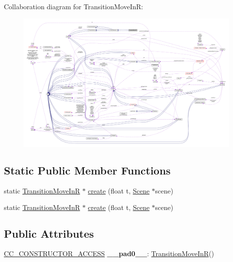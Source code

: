 Collaboration diagram for Transition\+Move\+InR\+:
\nopagebreak
\begin{figure}[H]
\begin{center}
\leavevmode
\includegraphics[width=350pt]{classTransitionMoveInR__coll__graph}
\end{center}
\end{figure}
\subsection*{Static Public Member Functions}
\begin{DoxyCompactItemize}
\item 
static \hyperlink{classTransitionMoveInR}{Transition\+Move\+InR} $\ast$ \hyperlink{classTransitionMoveInR_a37e498709830d50089d710dd6f182a30}{create} (float t, \hyperlink{classScene}{Scene} $\ast$scene)
\item 
static \hyperlink{classTransitionMoveInR}{Transition\+Move\+InR} $\ast$ \hyperlink{classTransitionMoveInR_af8cc045bd473dde2f0d0af7193c61b3d}{create} (float t, \hyperlink{classScene}{Scene} $\ast$scene)
\end{DoxyCompactItemize}
\subsection*{Public Attributes}
\begin{DoxyCompactItemize}
\item 
\mbox{\label{classTransitionMoveInR_a268053f3a910861d917223e0d3536473}} 
\hyperlink{_2cocos2d_2cocos_2base_2ccConfig_8h_a25ef1314f97c35a2ed3d029b0ead6da0}{C\+C\+\_\+\+C\+O\+N\+S\+T\+R\+U\+C\+T\+O\+R\+\_\+\+A\+C\+C\+E\+SS} {\bfseries \+\_\+\+\_\+pad0\+\_\+\+\_\+}\+: \hyperlink{classTransitionMoveInR}{Transition\+Move\+InR}()
\end{DoxyCompactItemize}

